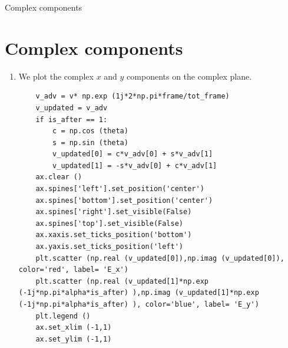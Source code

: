 \documentclass[12pt]{beamer}
\begin{document}
\begin{frame}{Complex components}
\section{Complex components}
\begin{enumerate}
	\item We plot the complex $x$ and $y$ components on the complex plane.
\begin{lstlisting}
    v_adv = v* np.exp (1j*2*np.pi*frame/tot_frame)
    v_updated = v_adv
    if is_after == 1:
        c = np.cos (theta)
        s = np.sin (theta)
        v_updated[0] = c*v_adv[0] + s*v_adv[1]
        v_updated[1] = -s*v_adv[0] + c*v_adv[1]
    ax.clear ()
    ax.spines['left'].set_position('center')
    ax.spines['bottom'].set_position('center')
    ax.spines['right'].set_visible(False)
    ax.spines['top'].set_visible(False)
    ax.xaxis.set_ticks_position('bottom')
    ax.yaxis.set_ticks_position('left')
    plt.scatter (np.real (v_updated[0]),np.imag (v_updated[0]), color='red', label= 'E_x')
    plt.scatter (np.real (v_updated[1]*np.exp (-1j*np.pi*alpha*is_after) ),np.imag (v_updated[1]*np.exp (-1j*np.pi*alpha*is_after) ), color='blue', label= 'E_y')
    plt.legend ()
    ax.set_xlim (-1,1)
    ax.set_ylim (-1,1)
\end{lstlisting}
\end{enumerate}
\end{frame}
\end{document}
